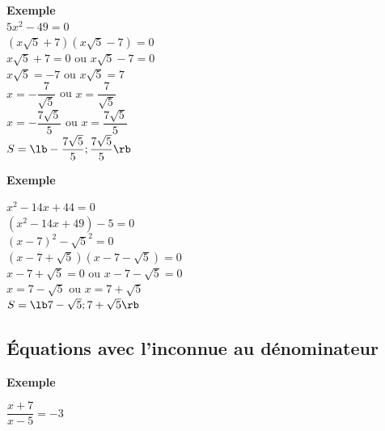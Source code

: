 \begin{minipage}{.5\textwidth}
\textbf{Exemple }\\

$ 5x^2 - 49 = 0 $ \\

$ \left(x\sqrt{5} + 7\right)\left(x\sqrt{5} - 7\right) = 0 $ \\

$ x\sqrt{5} + 7 = 0 $ ou $ x\sqrt{5} - 7 = 0 $ \\

$ x\sqrt{5} = -7 $ ou $ x\sqrt{5} = 7 $ \\

$ x = -\dfrac{7}{\sqrt{5}} $ ou $ x = \dfrac{7}{\sqrt{5}} $ \\

$ x = -\dfrac{7\sqrt{5}}{5} $ ou $ x = \dfrac{7\sqrt{5}}{5} $ \\

$ S = \lb -\dfrac{7\sqrt{5}}{5} ; \dfrac{7\sqrt{5}}{5} \rb $ \\

\vspace{.5cm}

\textbf{Exemple }

$ x^2 - 14x + 44 = 0 $\\

$ \left(x^2-14x+49\right)-5 = 0 $\\

$ \left(x-7\right)^2 - \sqrt{5}^2 = 0 $\\

$ \left(x-7+\sqrt{5}\right)\left(x-7-\sqrt{5}\right) = 0 $ \\

$ x-7 + \sqrt{5} = 0 $ ou $ x-7-\sqrt{5} = 0 $\\

$ x = 7 - \sqrt{5} $ ou $ x = 7 + \sqrt{5} $ \\

$ S = \lb 7 - \sqrt{5} ; 7+\sqrt{5} \rb $ \\
\end{minipage}

\newpage


\subsection{Équations avec l'inconnue au dénominateur}

\textbf{Exemple }

$ \dfrac{x+7}{x-5} = -3 $ \\

